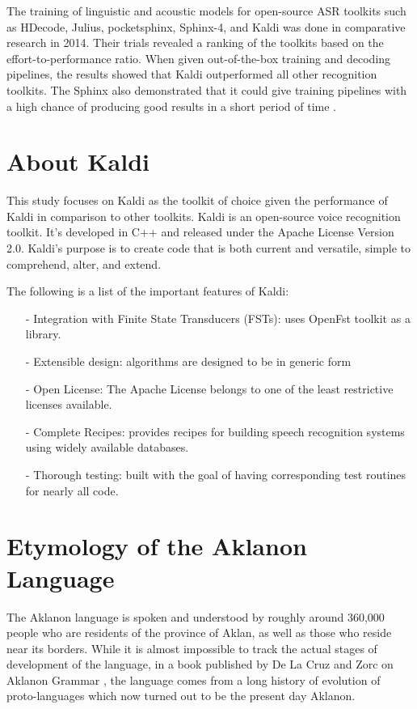The training of linguistic and acoustic models for open-source ASR toolkits such as HDecode, Julius, pocketsphinx, Sphinx-4, and Kaldi was done in comparative research in 2014. Their trials revealed a ranking of the toolkits based on the effort-to-performance ratio. When given out-of-the-box training and decoding pipelines, the results showed that Kaldi outperformed all other recognition toolkits. The Sphinx also demonstrated that it could give training pipelines with a high chance of producing good results in a short period of time \cite{gaida2014comparing}.

\section{About Kaldi}


This study focuses on Kaldi as the toolkit of choice given the performance of Kaldi in comparison to other toolkits. Kaldi is an open-source voice recognition toolkit. It's developed in C++ and released under the Apache License Version 2.0. Kaldi's purpose is to create code that is both current and versatile, simple to comprehend, alter, and extend.

\noindent
The following is a list of the important features of Kaldi: 

\begin{itemize}
\item[-] Integration with Finite State Transducers (FSTs): uses OpenFst toolkit as a library.
\item[-] Extensible design: algorithms are designed to be in generic form
\item[-] Open License: The Apache License belongs to one of the least restrictive licenses available. 
\item[-] Complete Recipes: provides recipes for building speech recognition systems using widely available databases.
\item[-] Thorough testing: built with the goal of having corresponding test routines for nearly all code.

\end{itemize}


\section{Etymology of the Aklanon Language}

The Aklanon language is spoken and understood by roughly around 360,000 people who are residents of the province of Aklan, as well as those who reside near its borders. While it is almost impossible to track the actual stages of development of the language, in a book published by De La Cruz and Zorc on Aklanon Grammar \cite{de1968study}, the language comes from a long history of evolution of proto-languages which now turned out to be the present day Aklanon. 

